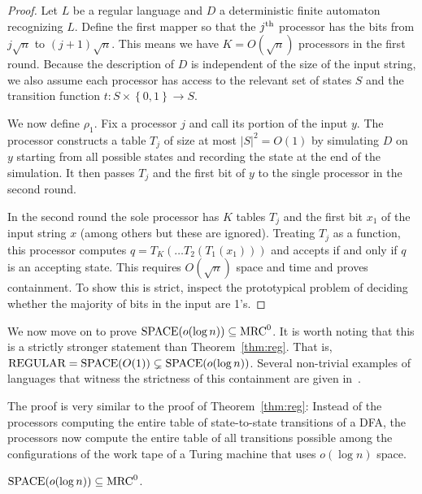 \documentclass[letterpaper,USenglish]{lipics}
\theoremstyle{definition}
\theoremstyle{remark}
\newcommand{\mrc}{\textup{MRC}}
\newcommand{\SPACE}{\textup{SPACE}}
\begin{document}
\begin{proof}
Let $L$ be a regular language and $D$ a deterministic finite automaton
recognizing $L$. Define the first mapper so
that the $j^\textup{th}$ processor has the bits from $j\sqrt{n}$ to
$(j+1)\sqrt{n}$. This means we have $K = O(\sqrt{n})$ processors in the first
round. Because the description of $D$ is independent of the size of the input
string, we also assume each processor has access to the relevant set of states
$S$ and the transition function $t: S \times \left \{ 0,1 \right \} \to S$.

We now define $\rho_1$. Fix a processor $j$ and call its portion of the input
$y$. The processor constructs a table $T_j$ of size at most $|S|^2 = O(1)$ by
simulating $D$ on $y$ starting from all possible states and recording the state
at the end of the simulation. It then passes $T_j$ and the first bit of $y$ to
the single processor in the second round.

In the second round the sole processor has $K$ tables $T_j$ and the first bit
$x_1$ of the input string $x$ (among others but these are ignored). Treating
$T_j$ as a function, this processor computes $q = T_K(\dots T_2(T_1(x_1)))$ and
accepts if and only if $q$ is an accepting state. This requires $O(\sqrt{n})$
space and time and proves containment. To show this is strict, inspect the
prototypical problem of deciding whether the majority of bits in the input are
1's.
\end{proof}

We now move on to prove $\SPACE(o(\log n))\subseteq \mrc^0$. It is worth noting
that this is a strictly stronger statement than Theorem~\ref{thm:reg}. That
is, $\textup{REGULAR}=\SPACE(O(1))\subsetneq \SPACE(o(\log n))$. Several
non-trivial examples of languages that witness the strictness of this
containment are given in~\cite{szepietowski1994turing}.

The proof is very similar to the proof of Theorem~\ref{thm:reg}:  Instead of
the processors computing the entire table of state-to-state transitions of a
DFA, the processors now compute the entire table of all transitions possible
among the configurations of the work tape of a Turing machine that uses $o(\log
n)$ space.

\begin{theorem} \label{thm:sublogspace}
$\textup{SPACE}(o(\log n))\subseteq \mrc^0$.
\end{theorem}
\end{document}
